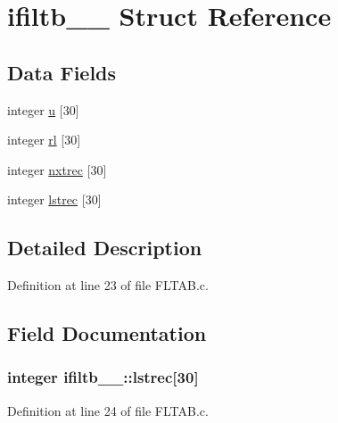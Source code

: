 \hypertarget{structifiltb__1__}{}\section{ifiltb\+\_\+\_\+ Struct Reference}
\label{structifiltb__1__}
\subsection*{Data Fields}
\begin{DoxyCompactItemize}
\item 
integer \hyperlink{structifiltb__1___aa2c6cbc5eae74c94b3368a2dfc346ff0}{u} \mbox{[}30\mbox{]}
\item 
integer \hyperlink{structifiltb__1___ae462e1de34e8467619a3a57a1e66ba57}{rl} \mbox{[}30\mbox{]}
\item 
integer \hyperlink{structifiltb__1___a9d83065c29aa4eb3ae463eebe28994d5}{nxtrec} \mbox{[}30\mbox{]}
\item 
integer \hyperlink{structifiltb__1___a43613778c1493b26ec4f1cecf6cca13a}{lstrec} \mbox{[}30\mbox{]}
\end{DoxyCompactItemize}


\subsection{Detailed Description}


Definition at line 23 of file F\+L\+T\+A\+B.\+c.



\subsection{Field Documentation}
\subsubsection[{\texorpdfstring{lstrec}{lstrec}}]{\setlength{\rightskip}{0pt plus 5cm}integer ifiltb\+\_\+\_\+\+::lstrec\mbox{[}30\mbox{]}}\hypertarget{structifiltb__1___a43613778c1493b26ec4f1cecf6cca13a}{}\label{structifiltb__1___a43613778c1493b26ec4f1cecf6cca13a}


Definition at line 24 of file F\+L\+T\+A\+B.\+c.

